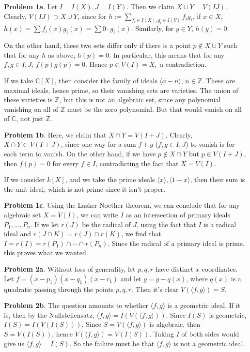 \documentclass[11pt]{amsart}
\theoremstyle{named}
\newcommand{\cmplx}{\mathbb{C}}
\newcommand{\Z}{\mathbb{Z}}
\begin{document}
\noindent \textbf{Problem 1a}. Let $I = I(X), J = I(Y)$. Then we claim $X \cup Y = V(IJ)$. Clearly, $V(IJ) \supset X \cup Y$, since for $h := \sum_{f_i \in I(X), g_i \in I(Y)} f_i g_i$, if $x \in X$, $h(x) = \sum f_i(x) g_i(x) = \sum 0 \cdot g_i(x).$ Similarly, for $y \in Y$, $h(y) = 0$.

On the other hand, these two sets differ only if there is a point $p \not\in X \cup Y$ such that for any $h$ as above, $h(p) = 0$. In particular, this means that for any $f, g \in I, J$, $f(p) g(p) = 0$. Hence $p \in V(I) = X,$ a contradiction.

If we take $\cmplx[X]$, then consider the family of ideals $\langle x - n \rangle$, $n \in \Z$. These are maximal ideals, hence prime, so their vanishing sets are varieties. The union of these varieties is $\Z$, but this is not an algebraic set, since any polynomial vanishing on all of $\Z$ must be the zero polynomial. But that would vanish on all of $\cmplx$, not just $\Z$.

\noindent \textbf{Problem 1b}. Here, we claim that $X \cap Y = V(I + J)$. Clearly, $X \cap Y \subset V(I + J)$, since one way for a sum $f + g$ ($f, g \in I, J$) to vanish is for each term to vanish. On the other hand, if we have $p \not\in X \cap Y$ but $p \in V(I + J)$, then $f(p) = 0$ for every $f \in I$, contradicting the fact that $X = V(I).$  

If we consider $k[X]$, and we take the prime ideals $\langle x \rangle, \langle 1 - x \rangle$, then their sum is the unit ideal, which is not prime since it isn't proper. 

\noindent\textbf{Problem 1c}. Using the Lasker-Noether theorem, we can conclude that for any algebraic set $X = V(I)$, we can write $I$ as an intersection of primary ideals $P_1, ..., P_n$. If we let $r(J)$ be the radical of $J$, using the fact that $I$ is a radical ideal and $r(J \cap K) = r(J) \cap r(K)$, we find that $I = r(I) = r(P_1) \cap \cdots \cap r(P_n)$. Since the radical of a primary ideal is prime, this proves what we wanted.

\noindent\textbf{Problem 2a}. Without loss of generality, let $p, q, r$ have distinct $x$ coordinates. Let $f = (x - p_1) (x - q_1) (x - r_1)$ and let $g = y - q(x)$, where $q(x)$ is a quadratic passing through the points $p, q, r$. Then it's clear $V(\langle f, g \rangle) = S.$

\noindent\textbf{Problem 2b}. The question amounts to whether $\langle f, g \rangle$ is a geometric ideal. If it is, then by the Nullstellensatz, $\langle f, g \rangle = I(V(\langle f, g \rangle))$. Since $I(S)$ is geometric, $I(S) = I(V(I(S)))$. Since $S = V(\langle f, g \rangle)$ is algebraic, then $S = V(I(S))$, hence $V(\langle f, g \rangle) = V(I(S))$. Taking $I$ of both sides would give us $\langle f, g \rangle = I(S).$ So the failure must be that $\langle f, g \rangle$ is not a geometric ideal.
\end{document}
